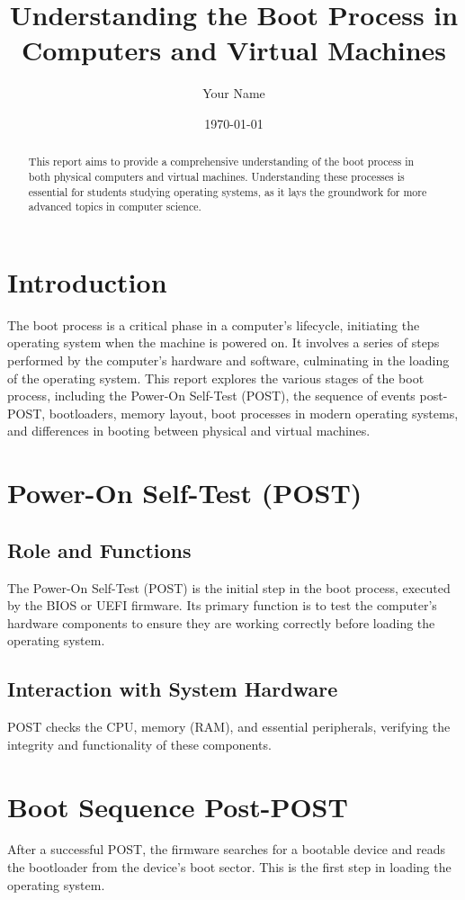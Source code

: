 \documentclass[12pt]{article}
\title{Understanding the Boot Process in Computers and Virtual Machines}
\author{Your Name}
\date{\today}
\begin{document}
\maketitle
\doublespacing

\begin{abstract}
This report aims to provide a comprehensive understanding of the boot process in both physical computers and virtual machines. Understanding these processes is essential for students studying operating systems, as it lays the groundwork for more advanced topics in computer science.
\end{abstract}

\newpage
\tableofcontents
\newpage

\section{Introduction}
The boot process is a critical phase in a computer's lifecycle, initiating the operating system when the machine is powered on. It involves a series of steps performed by the computer's hardware and software, culminating in the loading of the operating system. This report explores the various stages of the boot process, including the Power-On Self-Test (POST), the sequence of events post-POST, bootloaders, memory layout, boot processes in modern operating systems, and differences in booting between physical and virtual machines.

\section{Power-On Self-Test (POST)}
\subsection{Role and Functions}
The Power-On Self-Test (POST) is the initial step in the boot process, executed by the BIOS or UEFI firmware. Its primary function is to test the computer's hardware components to ensure they are working correctly before loading the operating system.

\subsection{Interaction with System Hardware}
POST checks the CPU, memory (RAM), and essential peripherals, verifying the integrity and functionality of these components.

\section{Boot Sequence Post-POST}
After a successful POST, the firmware searches for a bootable device and reads the bootloader from the device's boot sector. This is the first step in loading the operating system.
\end{document}

